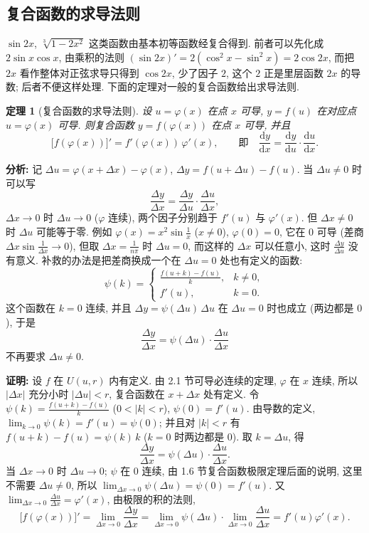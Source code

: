 \documentclass[UTF8,openany]{ctexbook}
\theoremstyle{chinesetextbook}
\newtheorem{theorem}{定理}[section]
\newenvironment{cnproof}{\par\indent\textbf{证明:} \ignorespaces}{\par}
\newcommand{\dd}{\mathrm d}
\begin{document}
\subsection{复合函数的求导法则}
$\sin2x$, $\sqrt[3]{1-2x^2}$ 这类函数由基本初等函数经复合得到. 前者可以先化成 $2\sin x\cos x$, 由乘积的法则 $(\sin2x)'=2(\cos^2x-\sin^2x)=2\cos2x$, 而把 $2x$ 看作整体对正弦求导只得到 $\cos2x$, 少了因子 $2$, 这个 $2$ 正是里层函数 $2x$ 的导数; 后者不便这样处理. 下面的定理对一般的复合函数给出求导法则.
\begin{theorem}[复合函数的求导法则]\label{thm:c2-2-chain}
设 $u=\varphi(x)$ 在点 $x$ 可导, $y=f(u)$ 在对应点 $u=\varphi(x)$ 可导. 则复合函数 $y=f(\varphi(x))$ 在点 $x$ 可导, 并且
\[
\bigl[f(\varphi(x))\bigr]'=f'(\varphi(x))\,\varphi'(x),\qquad\text{即}\quad\frac{\dd y}{\dd x}=\frac{\dd y}{\dd u}\cdot\frac{\dd u}{\dd x}.
\]
\end{theorem}
\par\indent\textbf{分析:} 记 $\Delta u=\varphi(x+\Delta x)-\varphi(x)$, $\Delta y=f(u+\Delta u)-f(u)$. 当 $\Delta u\ne0$ 时可以写
\[
\frac{\Delta y}{\Delta x}=\frac{\Delta y}{\Delta u}\cdot\frac{\Delta u}{\Delta x},
\]
$\Delta x\to0$ 时 $\Delta u\to0$ ($\varphi$ 连续), 两个因子分别趋于 $f'(u)$ 与 $\varphi'(x)$. 但 $\Delta x\ne0$ 时 $\Delta u$ 可能等于零. 例如 $\displaystyle\varphi(x)=x^2\sin\frac1x$ ($x\ne0$), $\varphi(0)=0$, 它在 $0$ 可导 (差商 $\displaystyle\Delta x\sin\frac1{\Delta x}\to0$), 但取 $\displaystyle\Delta x=\frac1{n\pi}$ 时 $\Delta u=0$, 而这样的 $\Delta x$ 可以任意小, 这时 $\displaystyle\frac{\Delta y}{\Delta u}$ 没有意义. 补救的办法是把差商换成一个在 $\Delta u=0$ 处也有定义的函数:
\[
\psi(k)=\begin{cases}\frac{f(u+k)-f(u)}k,&k\ne0,\\f'(u),&k=0.\end{cases}
\]
这个函数在 $k=0$ 连续, 并且 $\Delta y=\psi(\Delta u)\,\Delta u$ 在 $\Delta u=0$ 时也成立 (两边都是 $0$), 于是
\[
\frac{\Delta y}{\Delta x}=\psi(\Delta u)\cdot\frac{\Delta u}{\Delta x}
\]
不再要求 $\Delta u\ne0$.
\begin{cnproof}
设 $f$ 在 $U(u,r)$ 内有定义. 由 2.1 节可导必连续的定理, $\varphi$ 在 $x$ 连续, 所以 $|\Delta x|$ 充分小时 $|\Delta u|<r$, 复合函数在 $x+\Delta x$ 处有定义. 令 $\displaystyle\psi(k)=\frac{f(u+k)-f(u)}k$ ($0<|k|<r$), $\psi(0)=f'(u)$. 由导数的定义, $\displaystyle\lim_{k\to0}\psi(k)=f'(u)=\psi(0)$; 并且对 $|k|<r$ 有 $f(u+k)-f(u)=\psi(k)\,k$ ($k=0$ 时两边都是 $0$). 取 $k=\Delta u$, 得
\[
\frac{\Delta y}{\Delta x}=\psi(\Delta u)\cdot\frac{\Delta u}{\Delta x}.
\]
当 $\Delta x\to0$ 时 $\Delta u\to0$; $\psi$ 在 $0$ 连续, 由 1.6 节复合函数极限定理后面的说明, 这里不需要 $\Delta u\ne0$, 所以 $\displaystyle\lim_{\Delta x\to0}\psi(\Delta u)=\psi(0)=f'(u)$. 又 $\displaystyle\lim_{\Delta x\to0}\frac{\Delta u}{\Delta x}=\varphi'(x)$, 由极限的积的法则,
\[
\bigl[f(\varphi(x))\bigr]'=\lim_{\Delta x\to0}\frac{\Delta y}{\Delta x}=\lim_{\Delta x\to0}\psi(\Delta u)\cdot\lim_{\Delta x\to0}\frac{\Delta u}{\Delta x}=f'(u)\varphi'(x).
\]
\end{cnproof}
\end{document}
